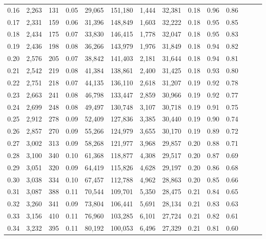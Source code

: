 \begin{tabular}{rrrrrrrrrrrrrr}
0.16 &  2,263 &  131 &  0.05 &   29,065 &  151,180 &   1,444 &  32,381 &  0.18 &  0.96 &      0.86 \\
0.17 &  2,331 &  159 &  0.06 &   31,396 &  148,849 &   1,603 &  32,222 &  0.18 &  0.95 &      0.85 \\
0.18 &  2,434 &  175 &  0.07 &   33,830 &  146,415 &   1,778 &  32,047 &  0.18 &  0.95 &      0.83 \\
0.19 &  2,436 &  198 &  0.08 &   36,266 &  143,979 &   1,976 &  31,849 &  0.18 &  0.94 &      0.82 \\
0.20 &  2,576 &  205 &  0.07 &   38,842 &  141,403 &   2,181 &  31,644 &  0.18 &  0.94 &      0.81 \\
0.21 &  2,542 &  219 &  0.08 &   41,384 &  138,861 &   2,400 &  31,425 &  0.18 &  0.93 &      0.80 \\
0.22 &  2,751 &  218 &  0.07 &   44,135 &  136,110 &   2,618 &  31,207 &  0.19 &  0.92 &      0.78 \\
0.23 &  2,663 &  241 &  0.08 &   46,798 &  133,447 &   2,859 &  30,966 &  0.19 &  0.92 &      0.77 \\
0.24 &  2,699 &  248 &  0.08 &   49,497 &  130,748 &   3,107 &  30,718 &  0.19 &  0.91 &      0.75 \\
0.25 &  2,912 &  278 &  0.09 &   52,409 &  127,836 &   3,385 &  30,440 &  0.19 &  0.90 &      0.74 \\
0.26 &  2,857 &  270 &  0.09 &   55,266 &  124,979 &   3,655 &  30,170 &  0.19 &  0.89 &      0.72 \\
0.27 &  3,002 &  313 &  0.09 &   58,268 &  121,977 &   3,968 &  29,857 &  0.20 &  0.88 &      0.71 \\
0.28 &  3,100 &  340 &  0.10 &   61,368 &  118,877 &   4,308 &  29,517 &  0.20 &  0.87 &      0.69 \\
0.29 &  3,051 &  320 &  0.09 &   64,419 &  115,826 &   4,628 &  29,197 &  0.20 &  0.86 &      0.68 \\
0.30 &  3,038 &  334 &  0.10 &   67,457 &  112,788 &   4,962 &  28,863 &  0.20 &  0.85 &      0.66 \\
0.31 &  3,087 &  388 &  0.11 &   70,544 &  109,701 &   5,350 &  28,475 &  0.21 &  0.84 &      0.65 \\
0.32 &  3,260 &  341 &  0.09 &   73,804 &  106,441 &   5,691 &  28,134 &  0.21 &  0.83 &      0.63 \\
0.33 &  3,156 &  410 &  0.11 &   76,960 &  103,285 &   6,101 &  27,724 &  0.21 &  0.82 &      0.61 \\
0.34 &  3,232 &  395 &  0.11 &   80,192 &  100,053 &   6,496 &  27,329 &  0.21 &  0.81 &      0.60 \\

\end{tabular}

